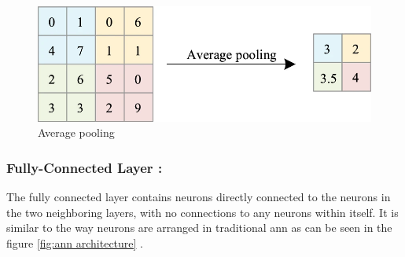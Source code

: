 \begin{figure}[H]
    \centering
    \includegraphics[width=1\linewidth]{Rohit_Master_Thesis//Images/average_pooling.png}
    \caption{Average pooling \cite{Zhao2024}}
    \label{fig:average pooling}
\end{figure}

\subsubsection*{Fully-Connected Layer :}

The fully connected layer contains neurons directly connected to the neurons in the two neighboring layers, with no connections to any neurons within itself. It is similar to the way neurons are arranged in traditional \gls{ann} as can be seen in the figure \ref{fig:ann architecture} \cite{oshea2015introductionconvolutionalneuralnetworks}.








